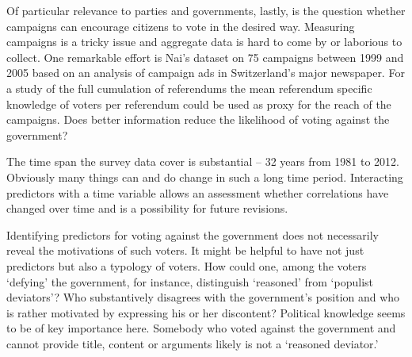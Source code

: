 \documentclass[11pt,a4paper]{article}\usepackage[]{graphicx}\usepackage[]{color}
\begin{document}
    
    Of particular relevance to parties and governments, lastly, is the question whether campaigns can encourage citizens to vote in the desired way. Measuring campaigns is a tricky issue and aggregate data is hard to come by or laborious to collect. One remarkable effort is Nai's \citeyear{nai_choisir_2013} dataset on 75 campaigns between 1999 and 2005 based on an analysis of campaign ads in Switzerland's major newspaper. For a study of the full cumulation of referendums the mean referendum specific knowledge of voters per referendum could be used as proxy for the reach of the campaigns. Does better information reduce the likelihood of voting against the government?
    
    The time span the survey data cover is substantial -- 32 years from 1981 to 2012. Obviously many things can and do change in such a long time period. Interacting predictors with a time variable allows an assessment whether correlations have changed over time and is a possibility for future revisions.
    
    Identifying predictors for voting against the government does not necessarily reveal the motivations of such voters. It might be helpful to have not just predictors but also a typology of voters. How could one, among the voters `defying' the government, for instance, distinguish `reasoned' from `populist deviators'?  Who substantively disagrees with the government's position and who is rather motivated by expressing his or her discontent? Political knowledge seems to be of key importance here. Somebody who voted against the government and cannot provide title, content or arguments likely is not a `reasoned deviator.' %
    
    
\end{document}
